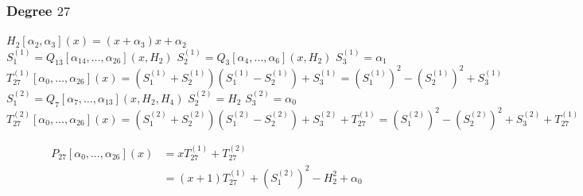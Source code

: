 \subsubsection{Degree \texorpdfstring{$27$}{27}}
\begin{algorithm}[H]
    \caption{
        Thirteen-product compatible joint realization in degree $27$.
    }

    \begin{algorithmic}
        \State $H_2[\alpha_2, \alpha_3](x) = (x + \alpha_3)x + \alpha_2$
        \\
        \State $S^{(1)}_1 = Q_{13}[\alpha_{14}, \ldots, \alpha_{26}](x, H_2)$ 
        \State $S^{(1)}_2 = Q_3[\alpha_4, \ldots, \alpha_6](x, H_2)$
        \State $S^{(1)}_3 = \alpha_1$
        \State $T^{(1)}_{27}[\alpha_0, \ldots, \alpha_{26}](x)
            = (S^{(1)}_1 + S^{(1)}_2)(S^{(1)}_1 - S^{(1)}_2) + S^{(1)}_3
            = (S^{(1)}_1)^2 - (S^{(1)}_2)^2 + S^{(1)}_3$
        \\
        \State $S^{(2)}_1 = Q_7[\alpha_7, \ldots, \alpha_{13}](x, H_2, H_4)$
        \State $S^{(2)}_2 = H_2$
        \State $S^{(2)}_3 = \alpha_0$
        \State $T^{(2)}_{27}[\alpha_0, \ldots, \alpha_{26}](x)
            = (S^{(2)}_1 + S^{(2)}_2)(S^{(2)}_1 - S^{(2)}_2) + S^{(2)}_3 + T^{(1)}_{27}
            = (S^{(2)}_1)^2 - (S^{(2)}_2)^2 + S^{(2)}_3 + T^{(1)}_{27}$

        \State \begin{align}
            P_{27}[\alpha_0, \ldots, \alpha_{26}](x)
            &= x T^{(1)}_{27} + T^{(2)}_{27}
            \\&= (x+1)T^{(1)}_{27} + (S^{(2)}_1)^2 - H_2^2 + \alpha_0
        \end{align}
    \end{algorithmic}
\end{algorithm}


